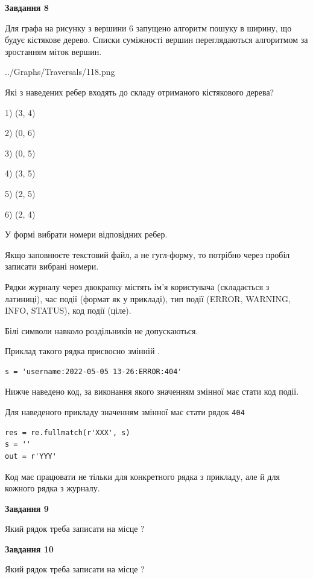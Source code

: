 \documentclass[12pt, ukrainian]{article}
\def\code#1{\Verb!#1!}
\begin{document}
{\begin {large}
{\begin {center}\textbf{Завдання 8}\end {center}}\par
Для графа на рисунку з вершини 6 запущено алгоритм пошуку в ширину, що будує кістякове дерево. Списки суміжності вершин переглядаються алгоритмом за зростанням міток вершин.\par
\begin{center}
	{../Graphs/Traversals/118.png}
\end{center}
\par Які з наведених ребер входять до складу отриманого кістякового дерева?\par
1) (3, 4)\par
2) (0, 6)\par
3) (0, 5)\par
4) (3, 5)\par
5) (2, 5)\par
6) (2, 4)\par
{\vskip 15pt} У формі вибрати номери відповідних ребер.


Якщо заповнюєте текстовий файл, а не гугл-форму, то потрібно через пробіл записа\-ти вибрані номери.\par
\newpage


Рядки журналу через двокрапку містять ім'я користувача (складається з латиниці), час події (фор\-мат як у прикладі), тип події (ERROR, WARNING, INFO, STATUS), код події (ціле).

Білі символи навколо роздільників не допускаються.

Приклад такого рядка присвоєно змінній .



\begin{verbatim}
s = 'username:2022-05-05 13-26:ERROR:404'
\end{verbatim}


Нижче наведено код, за виконання якого значенням змінної  має стати код події.

Для наведеного прикладу значенням змінної  має стати рядок \code{404}



\begin{verbatim}
res = re.fullmatch(r'XXX', s)
s = ''
out = r'YYY'
\end{verbatim}


Код має працювати не тільки для конкретного рядка з прикладу, але й для кожного рядка з журналу.

{\begin {center}\textbf{Завдання 9}\end {center}}\par
Який рядок треба записати на місце  ?\par
\vspace{5mm}


{\begin {center}\textbf{Завдання 10}\end {center}}\par
Який рядок треба записати на місце  ?\par


\newpage


\end {large}}
\end{document}
